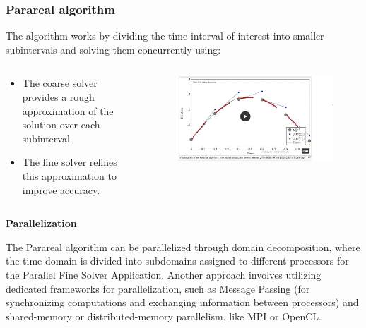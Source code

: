 \documentclass[
	11pt,
]{beamer}
\newcommand\myheading[1]{%
  \par\bigskip
  {\Large\bfseries#1}\par\smallskip}
\begin{document}
\begin{frame}
    \frametitle{Parareal algorithm}
    The algorithm works by dividing the time interval of interest into smaller subintervals and solving them concurrently using:
    \begin{columns}[c]
        \begin{column}{0.45\textwidth}
            \begin{itemize}
                \item The coarse solver provides a rough approximation of the solution over each subinterval.
                \item The fine solver refines this approximation to improve accuracy.
            \end{itemize}
        \end{column}
        \begin{column}{0.5\textwidth}
            \begin{figure}
                \includegraphics[width=1.\linewidth]{parareal.png}
            \end{figure}
        \end{column}
    \end{columns}
\end{frame}
   \begin{frame}
   \myheading{Parallelization}  
    The Parareal algorithm can be parallelized through domain decomposition, where the time domain is divided into subdomains assigned to different processors for the Parallel Fine Solver Application. Another approach involves utilizing dedicated frameworks for parallelization, such as Message Passing (for synchronizing computations and exchanging information between processors) and shared-memory or distributed-memory parallelism, like MPI or OpenCL.
   \end{frame}
\end{document}
